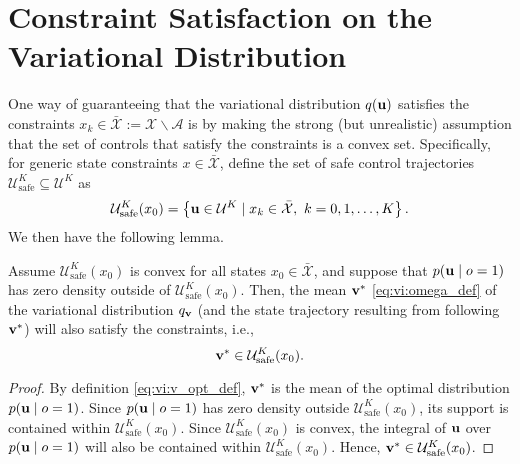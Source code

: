 \newpage
\section{Constraint Satisfaction on the Variational Distribution} \label{app:convex_controls}
One way of guaranteeing that the variational distribution $q({\bf u})$ satisfies the constraints $x_k \in \bar{\mathcal{X}} := \mathcal{X} \backslash \mathcal{A}$ is by making the strong (but unrealistic) assumption that the set of controls that satisfy the constraints is a convex set.
Specifically, for generic state constraints $x \in \bar{\mathcal{X}}$, define the set of safe control trajectories $\mathcal{U}^K_{\text{safe}} \subseteq \mathcal{U}^K$ as
\begin{equation}
    \mathcal{U}^K_{\text{safe}}(x_0) = \left\{ {\bf u} \in \mathcal{U}^K \mid x_k \in \bar{\mathcal{X}},~ k =0, 1, \ldots, K \right\}.
\end{equation}
We then have the following lemma.

\begin{lemma}
    Assume $\mathcal{U}^K_{\mathrm{safe}}(x_0)$ is convex for all states $x_0 \in \bar{\mathcal{X}}$,
    and suppose that $p({\bf u} \mid o=1)$ has zero density outside of $\mathcal{U}^K_{\mathrm{safe}}(x_0)$.
    Then, the mean ${\bf v}^*$ \eqref{eq:vi:omega_def} of the variational distribution $q_{{\bf v}}$ (and the state trajectory resulting from following ${\bf v}^*$) will also satisfy the constraints, i.e.,
    \begin{equation}
        {\bf v}^* \in \mathcal{U}^K_{\mathrm{safe}}(x_0).
    \end{equation}
\end{lemma}

\begin{proof}
    By definition \eqref{eq:vi:v_opt_def}, ${\bf v}^*$ is the mean of the optimal distribution $p({\bf u} \mid o=1)$.
    Since $p({\bf u} \mid o=1)$ has zero density outside $\mathcal{U}^K_{\text{safe}}(x_0)$, its support is contained within $\mathcal{U}^K_{\text{safe}}(x_0)$.
    Since $\mathcal{U}^K_{\text{safe}}(x_0)$ is convex, the integral of ${\bf u}$ over $p({\bf u} \mid o=1)$ will also be contained within $\mathcal{U}^K_{\text{safe}}(x_0)$. Hence, ${\bf v}^* \in \mathcal{U}^K_{\text{safe}}(x_0)$.
\end{proof}